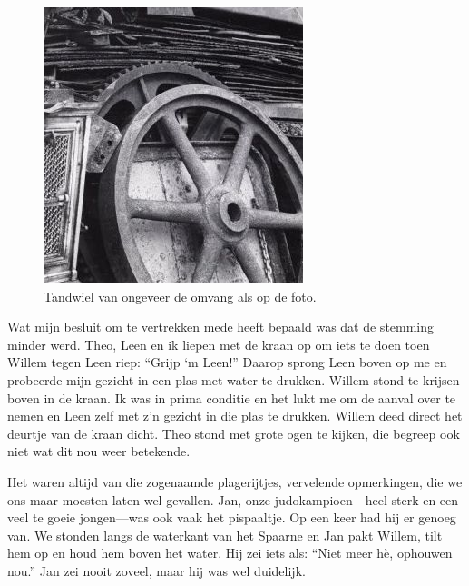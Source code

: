 \documentclass[12pt,twoside, openright]{memoir}
\begin{document}
\begin{figure}
\centering
\includegraphics[width=\textwidth]{img/227Tandwiel}
\caption*{\footnotesize Tandwiel van ongeveer de omvang als op de foto.}
\end{figure}

Wat mijn besluit om te vertrekken mede heeft bepaald was dat de stemming minder werd. Theo, Leen en ik liepen met de kraan op om iets te doen toen Willem tegen Leen riep: ``Grijp ‘m Leen!'' Daarop sprong Leen boven op me en probeerde mijn gezicht in een plas met water te drukken. Willem stond te krijsen boven in de kraan. Ik was in prima conditie en het lukt me om de aanval  over te nemen en Leen zelf met z’n gezicht in die plas te drukken. Willem deed direct het deurtje van de kraan dicht. Theo stond met grote ogen te kijken, die begreep ook niet wat dit nou weer betekende.

Het waren altijd van die zogenaamde plagerijtjes, vervelende opmerkingen, die we ons maar moesten laten wel gevallen. Jan, onze judokampioen---heel sterk en een veel te goeie jongen---was ook vaak het pispaaltje. Op een keer had hij er genoeg van. We stonden langs de waterkant van het Spaarne en Jan pakt Willem, tilt hem op en houd hem boven het water. Hij zei iets als: ``Niet meer hè, ophouwen nou.'' Jan zei nooit zoveel, maar hij was wel duidelijk.
\end{document}
